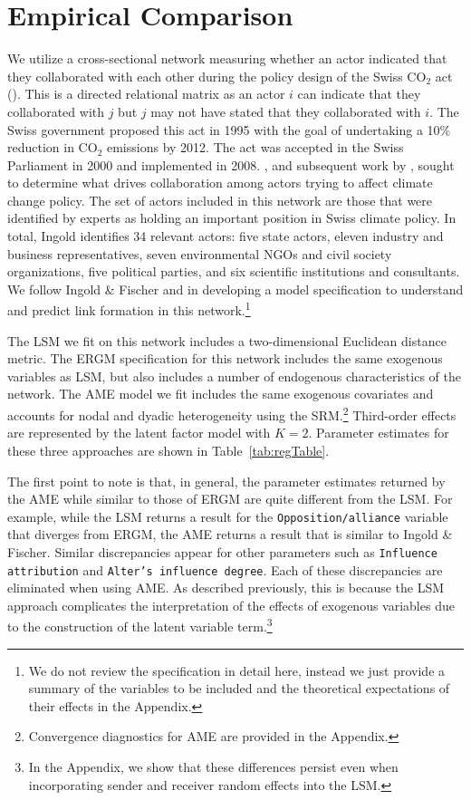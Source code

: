 \section*{\textbf{Empirical Comparison}}

We utilize a cross-sectional network measuring whether an actor indicated that they collaborated with each other during the policy design of the Swiss CO$_{2}$ act (\citealt{ingold:2008}). This is a directed relational matrix as an actor $i$ can indicate that they collaborated with $j$ but $j$ may not have stated that they collaborated with $i$. The Swiss government proposed this act in 1995 with the goal of undertaking a 10\% reduction in CO$_{2}$ emissions by 2012. The act was accepted in the Swiss Parliament in 2000 and implemented in 2008. \citet{ingold:2008}, and subsequent work by \citet{ingold:fischer:2014}, sought to determine what drives collaboration among actors trying to affect climate change policy. The set of actors included in this network are those that were identified by experts as holding an important position in Swiss climate policy. In total, Ingold identifies 34 relevant actors: five state actors, eleven industry and business representatives, seven environmental NGOs and civil society organizations, five political parties, and six scientific institutions and consultants. We follow Ingold \& Fischer and \citet{cranmer:etal:2016} in developing a model specification to understand and predict link formation in this network.\footnote{We do not review the specification in detail here, instead we just provide a summary of the variables to be included and the theoretical expectations of their effects in the Appendix.}

The LSM we fit on this network includes a two-dimensional Euclidean distance metric. The ERGM specification for this network includes the same exogenous variables as LSM, but also includes a number of endogenous characteristics of the network. The AME model we fit includes the same exogenous covariates and accounts for nodal and dyadic heterogeneity using the SRM.\footnote{Convergence diagnostics for AME are provided in the Appendix.} Third-order effects are represented by the latent factor model with $K=2$. Parameter estimates for these three approaches are shown in Table~\ref{tab:regTable}.

The first point to note is that, in general, the parameter estimates returned by the AME while similar to those of ERGM are quite different from the LSM. For example, while the LSM returns a result for the \texttt{Opposition/alliance} variable that diverges from ERGM, the AME returns a result that is similar to Ingold \& Fischer. Similar discrepancies appear for other parameters such as \texttt{Influence attribution} and \texttt{Alter's influence degree}. Each of these discrepancies are eliminated when using AME. As described previously, this is because the LSM approach complicates the interpretation of the effects of exogenous variables due to the construction of the latent variable term.\footnote{In the Appendix, we show that these differences persist even when incorporating sender and receiver random effects into the LSM.}

